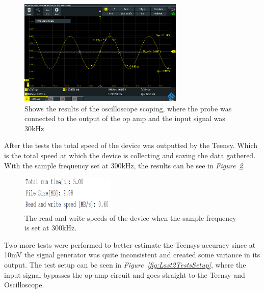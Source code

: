 \begin{figure}[h]
    \centering
    \includegraphics[width=0.7\textwidth]{graphics/30k10mvPP300ksamp.PNG}
    \caption{Shows the results of the oscilloscope scoping, where the probe was connected to the output of the op amp and the input signal was 30kHz}
    \label{fig:Oscillo30k300k}
\end{figure}

\vspace{4cm}

After the tests the total speed of the device was outputted by the Teensy.
Which is the total speed at which the device is collecting and saving the data gathered.
With the sample frequency set at 300kHz, the results can be see in \textit{Figure~\ref{fig:SpeedPDBCont}}.


\begin{figure}[h]
    \centering
    \includegraphics[width=0.4\textwidth]{graphics/Speed300khzFortest16bit20to100khz.png}
    \caption{The read and write speeds of the device when the sample frequency is set at 300kHz.}
    \label{fig:SpeedPDBCont}
\end{figure}

Two more tests were performed to better estimate the Teensys accuracy since at 10mV the signal generator was quite inconsistent and created some variance in its output. 
The test setup can be seen in \textit{Figure~\ref{fig:Last2TestsSetup}}, where the input signal bypasses the op-amp circuit and goes straight to the Teensy and Oscilloscope.

